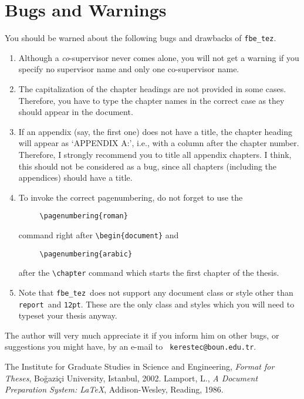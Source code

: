 \documentclass[12pt]{article}
\newcommand\fbe{{\tt fbe\_tez}}
\newcommand\report{{\tt report}}
\begin{document}
\section{Bugs and Warnings}
You should be warned about the following bugs and drawbacks of \fbe.
\begin{enumerate}
\item Although a {\em co}-supervisor never comes alone, you will not
  get a warning if you specify no supervisor name and only one
  co-supervisor name.
\item The capitalization of the chapter headings are not provided in
  some cases. Therefore, you have to type the chapter names in the
  correct case as they should appear in the document.
\item If an appendix (say, the first one) does not have a title, the
  chapter heading will appear as `APPENDIX A:', i.e., with a column
  after the chapter number. Therefore, I strongly recommend you to
  title all appendix chapters. I think, this should not be considered
  as a bug, since all chapters (including the appendices) should have
  a title.
\item To invoke the correct pagenumbering, do not forget to use the
\begin{verbatim}
     \pagenumbering{roman}
\end{verbatim}
  command right after \verb/\begin{document}/ and
\begin{verbatim}
     \pagenumbering{arabic}
\end{verbatim}
  after the \verb/\chapter/ command which starts the first chapter of
  the thesis.
\item Note that \fbe\ does not support any document class or
  style other than \report\ and {\tt 12pt}. These are the only class and
  styles which you will need to typeset your thesis anyway.
\end{enumerate}

The author will very much appreciate it if you inform him on other
bugs, or suggestions you might have, by an e-mail to {\tt
kerestec@boun.edu.tr}.

\begin{thebibliography}{9}
 The Institute for Graduate Studies in Science and
  Engineering, {\em Format for Theses},
  Bo\u gazi\c ci University, Istanbul, 2002.
 Lamport, L., {\em A Document Preparation System:
  \LaTeX}, Addison-Wesley, Reading, 1986.
\end{thebibliography}
\end{document}

